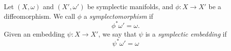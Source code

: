 

    Let $(X,  \omega)$ and $(X',  \omega')$ be symplectic manifolds,  and $\phi: X\to X' $ be a diffeomorphism. 
    We call $\phi$ a \emph{symplectomorphism} if
    \[\phi^*\omega'=\omega.\]
    Given an embedding $\psi: X\to X'$, we say that $\psi$ is a \emph{symplectic embedding} if 
    \[\psi^*\omega'=\omega\]

